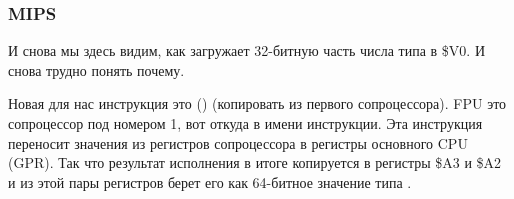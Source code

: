 \subsubsection{MIPS}



И снова мы здесь видим, как  загружает 32-битную часть числа типа \Tdouble в \$V0.
И снова трудно понять почему.

Новая для нас инструкция это  () (копировать из первого сопроцессора).
FPU это сопроцессор под номером 1, вот откуда  в имени инструкции.
Эта инструкция переносит значения из регистров сопроцессора в регистры основного CPU (\ac{GPR}).
Так что результат исполнения  в итоге копируется в регистры \$A3 и \$A2
и из этой пары регистров \printf берет его как 64-битное значение типа \Tdouble.

